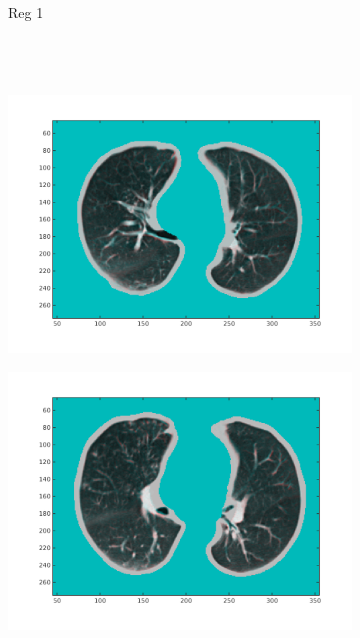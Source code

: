 \documentclass[11pt,a4paper,oneside]{report}
\begin{document}
\begin{figure}
  \centering
  \begin{subfigure}[b]{0.1\textwidth}
    Reg 1\\\\\\\\
  \end{subfigure}%
  \hspace*{-1.9em}
  \begin{subfigure}[b]{0.3\textwidth}
	  \includegraphics[width=\textwidth, trim=20 20 20 20]{figures/reg1/reg1_1_66.png}
  \end{subfigure}%
  \begin{subfigure}[b]{0.3\textwidth}
	  \includegraphics[width=\textwidth, trim=20 20 20 20]{figures/reg1/reg2_5_60.png}

\end{subfigure}
\end{figure}
\end{document}
